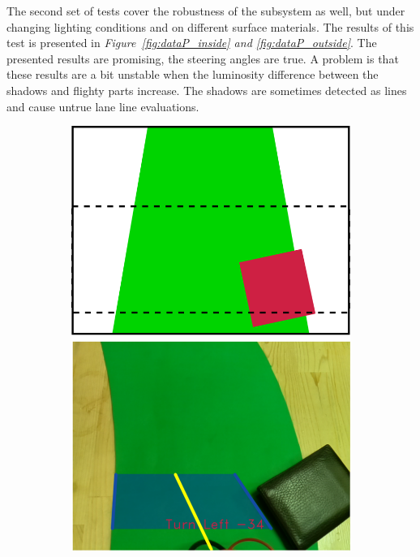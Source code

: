 \documentclass[a4paper,12pt]{article}
\begin{document}
	The second set of tests cover the robustness of the subsystem as well, but under changing lighting conditions and on different surface materials. The results of this test is presented in \textit{Figure~\ref{fig:dataP_inside} and \ref{fig:dataP_outside}}. The presented results are promising, the steering angles are true. A problem is that these results are a bit unstable when the luminosity difference between the shadows and flighty parts increase. The shadows are sometimes detected as lines and cause untrue lane line evaluations.	
	
	\begin{figure}[H]
	\setlength{\unitlength}{\textwidth} 
	\centering
	\begin{subfigure}{.31\textwidth}
		\centering
		\includegraphics[width=0.30\unitlength]{images/path_images/down_1}

\end{subfigure}
\end{figure}
\end{document}

